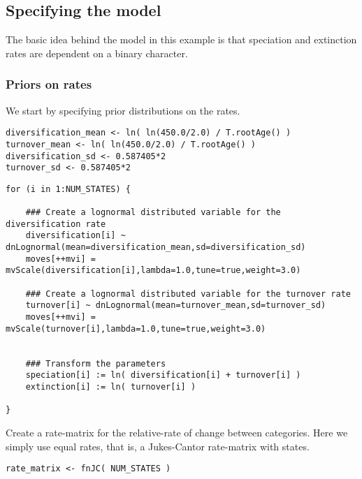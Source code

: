 \subsection{Specifying the model}

The basic idea behind the model in this example is that speciation and extinction rates are dependent on a binary character.


\subsubsection{Priors on rates}
We start by specifying prior distributions on the rates.

{\tt \begin{snugshade*}
\begin{lstlisting}
diversification_mean <- ln( ln(450.0/2.0) / T.rootAge() )
turnover_mean <- ln( ln(450.0/2.0) / T.rootAge() )
diversification_sd <- 0.587405*2
turnover_sd <- 0.587405*2
\end{lstlisting}
\end{snugshade*}}


{\tt \begin{snugshade*}
\begin{lstlisting}
for (i in 1:NUM_STATES) {

    ### Create a lognormal distributed variable for the diversification rate
    diversification[i] ~ dnLognormal(mean=diversification_mean,sd=diversification_sd) 
    moves[++mvi] = mvScale(diversification[i],lambda=1.0,tune=true,weight=3.0)

    ### Create a lognormal distributed variable for the turnover rate
    turnover[i] ~ dnLognormal(mean=turnover_mean,sd=turnover_sd) 
    moves[++mvi] = mvScale(turnover[i],lambda=1.0,tune=true,weight=3.0)


    ### Transform the parameters
    speciation[i] := ln( diversification[i] + turnover[i] )
    extinction[i] := ln( turnover[i] ) 

}
\end{lstlisting}
\end{snugshade*}}

Create a rate-matrix for the relative-rate of change between categories.
Here we simply use equal rates, that is,  a Jukes-Cantor rate-matrix with  states.
{\tt \begin{snugshade*}
\begin{lstlisting}
rate_matrix <- fnJC( NUM_STATES )
\end{lstlisting}
\end{snugshade*}}

